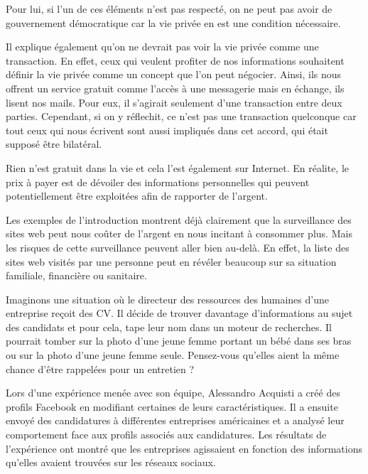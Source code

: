 Pour lui, si l'un de ces éléments n'est pas respecté, on ne peut pas avoir de gouvernement démocratique car la vie privée en est une condition nécessaire.
\newline

Il explique également qu'on ne devrait pas voir la vie privée comme une transaction. En effet, ceux qui veulent profiter de nos informations souhaitent définir la vie privée comme un concept que l'on peut négocier. Ainsi, ils nous offrent un service gratuit comme l'accès à une messagerie mais en échange, ils lisent nos mails. Pour eux, il s'agirait seulement d'une transaction entre deux parties. Cependant, si on y réflechit, ce n'est pas une transaction quelconque car tout ceux qui nous écrivent sont aussi impliqués dans cet accord, qui était supposé être bilatéral.

Rien n'est gratuit dans la vie et cela l'est également sur Internet. En réalite, le prix à payer est de dévoiler des informations personnelles qui peuvent potentiellement être exploitées afin de rapporter de l'argent.
\newline

Les exemples de l'introduction montrent déjà clairement que la surveillance des sites web peut nous coûter de l'argent en nous incitant à consommer plus. Mais les risques de cette surveillance peuvent aller bien au-delà. En effet, la liste des sites web visités par une personne peut en révéler beaucoup sur sa situation familiale, financière ou sanitaire.
\newline

Imaginons une situation où le directeur des ressources des humaines d'une entreprise reçoit des CV. Il décide de trouver davantage d'informations au sujet des candidats et pour cela, tape leur nom dans un moteur de recherches. Il pourrait tomber sur la photo d'une jeune femme portant un bébé dans ses bras ou sur la photo d'une jeune femme seule. Pensez-vous qu'elles aient la même chance d'être rappelées pour un entretien ?

Lors d'une expérience menée avec son équipe, Alessandro Acquisti a créé des profils Facebook en modifiant certaines de leurs caractéristiques. Il a ensuite envoyé des candidatures à différentes entreprises américaines et a analysé leur comportement face aux profils associés aux candidatures. Les résultats de l'expérience ont montré que les entreprises agissaient en fonction des informations qu'elles avaient trouvées sur les réseaux sociaux.
\newline

